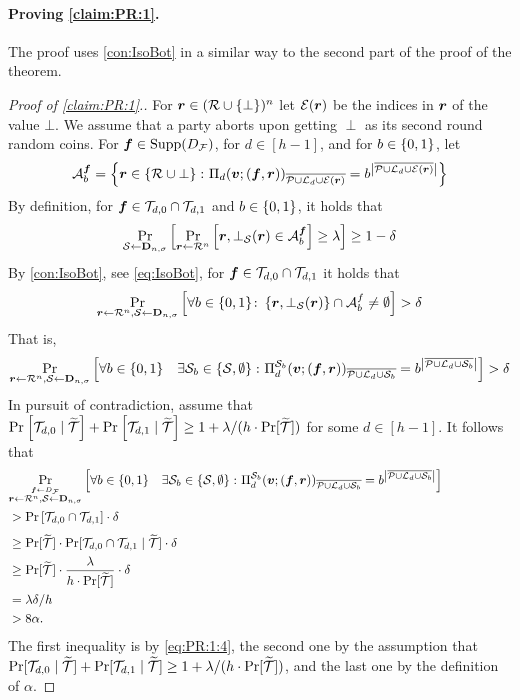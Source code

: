 \paragraph{Proving \cref{claim:PR:1}.}



The proof uses \cref{con:IsoBot} in a similar way to the second part of the proof of the theorem.


\begin{proof}[Proof of \cref{claim:PR:1}.]
For ${ \boldsymbol{r}} \in (\mathcal{R}\cup\{\bot\})^n$ let $ \mathcal{E}({ \boldsymbol{r}})$ be the indices in ${ \boldsymbol{r}}$ of the value $\bot$.
We assume \wlg that a party aborts upon getting $\perp$ as its second round random coins. For ${ \boldsymbol{f}} \in \operatorname{Supp}(D_{\cal F})$, for $d\in [h-1]$, and for $b \in \{0,1\}$, let
\begin{align}
\mathcal{A}^{ \boldsymbol{f}}_b = \left\{{ \boldsymbol{r}} \in \left\{\mathcal{R} \cup \bot\right\} \colon \Pi_d({ \boldsymbol{v}};({ \boldsymbol{f}},{ \boldsymbol{r}}))_{\overline{\mathcal{P} \cup {\cal{L}}_d \cup \mathcal{E}({ \boldsymbol{r}})}} = b^{\left|\overline{\mathcal{P} \cup {\cal{L}}_d \cup \mathcal{E}({ \boldsymbol{r}})}\right|}\right\}
\end{align}
By definition, for ${ \boldsymbol{f}} \in \mathcal{T}_{d,0} \cap \mathcal{T}_{d,1}$ and $b\in \{0,1\}$, it holds that
\begin{align}
\Pr_{{\cal{S}}\gets \mathbf{D}_{n,\sigma}}\left[\Pr_{{ \boldsymbol{r}} \gets \mathcal{R}^n}\left[{ \boldsymbol{r}},\bot_{\mathcal{S}}({ \boldsymbol{r}}) \in \mathcal{A}^{ \boldsymbol{f}}_b\right] \ge \lambda\right] \ge 1-\delta
\end{align}
By \cref{con:IsoBot}, see \cref{eq:IsoBot}, for ${ \boldsymbol{f}} \in \mathcal{T}_{d,0} \cap \mathcal{T}_{d,1}$ it holds that
\begin{align*}
\Pr_{{ \boldsymbol{r}}\gets \mathcal{R}^n,\mathcal{S} \gets \mathbf{D}_{n,\sigma}}\left[\forall b \in \{0,1\} \colon \left\{{ \boldsymbol{r}},\bot_{\mathcal{S}}({ \boldsymbol{r}})\right\}\cap \mathcal{A}^f_b \neq \emptyset\right] > \delta
\end{align*}
That is,
\begin{align}\label{eq:PR:1:4}
\Pr_{{ \boldsymbol{r}}\gets \mathcal{R}^n,\mathcal{S} \gets \mathbf{D}_{n,\sigma}}\left[\forall b\in \{0,1\} \quad \exists {\cal{S}}_b \in \left\{{\cal{S}},\emptyset\right\} \colon \Pi^{\mathcal{S}_b}_{d}({ \boldsymbol{v}};({ \boldsymbol{f}},{ \boldsymbol{r}}))_{ \overline{\mathcal{P} \cup {\cal{L}}_d \cup\mathcal{S}_b} }= b^{ \left|\overline{ \mathcal{P} \cup {\cal{L}}_d \cup\mathcal{S}_b}\right|}\right] >\delta
\end{align}
In pursuit of contradiction, assume that $\Pr_{}\left[\mathcal{T}_{d,0} \mid {\widetilde{\mathcal{T}}}\right] + \Pr_{}\left[\mathcal{T}_{d,1} \mid {\widetilde{\mathcal{T}}}\right] \ge 1 + \lambda/(h\cdot \Pr[{\widetilde{\mathcal{T}}}])$ for some $d \in [h-1]$. It follows that
\begin{align}\label{eq:PR:1:5}
\lefteqn{\ppr{\stackrel{\vf \gets \DF}{\vr\gets \cR^n,\cS \gets \bns}}{\forall \o\in \zo \quad \exists \cs_\o \in \set{\cs,\emptyset}\colon \Pi^{ \cs_\o}_{d}(\vv;(\vf,\vr))_{ \overline{\cP \cup \cL_d \cup \cs_\o} }= \o^{ \size{\overline{ \cP \cup \cL_d \cup \cs_\o}}}}}\\
&> \pr{\cT_{d,0} \cap \cT_{d,1}}\cdot \delta \hskip30em \nonumber\\
&\ge \Pr[\tT]\cdot \Pr[\cT_{d,0} \cap \cT_{d,1} \mid \tT] \cdot \delta \nonumber\\
&\ge \Pr[\tT]\cdot \frac{\lambda}{h\cdot \Pr[\tT]} \cdot \delta \nonumber\\
&= \lambda\delta /h \nonumber\\
&> 8\alpha.\nonumber
\end{align}
The first inequality is by \cref{eq:PR:1:4}, the second one by the assumption that $\Pr[\mathcal{T}_{d,0} \mid {\widetilde{\mathcal{T}}}] + \Pr[\mathcal{T}_{d,1} \mid {\widetilde{\mathcal{T}}}] \ge 1 + \lambda/(h\cdot \Pr[{\widetilde{\mathcal{T}}}])$, and the last one by the definition of $\alpha$.


\end{proof}
